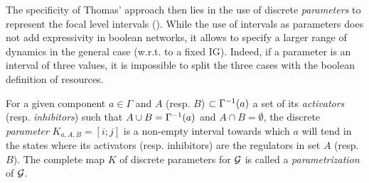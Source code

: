 The specificity of Thomas' approach then lies in the use of discrete \emph{parameters} to represent the focal level intervals ().
While the use of intervals as parameters does not add expressivity in boolean networks, it allows to specify a larger range of dynamics in the general case (w.r.t. to a fixed IG).
Indeed, if a parameter is an interval of three values, it is impossible to split the three cases with the boolean definition of resources.

\begin{definition}\label{def:param}
For a given component $a \in \Gamma$ and $A$ (resp. $B$) $\subset \Gamma^{-1}(a)$ a set of its \emph{activators} (resp. \emph{inhibitors}) such that $A \cup B = \Gamma^{-1}(a)$ and $A \cap B = \emptyset$,
the discrete \emph{parameter} $K_{a,A,B} = [i; j]$ is a non-empty interval towards which $a$ will tend
in the states where its activators (resp. inhibitors) are the regulators in set $A$ (resp. $B$).
The complete map $K$ of discrete parameters for $\mathcal{G}$ is called a \emph{parametrization} of $\mathcal{G}$.
\end{definition}

\begin{comment}
\begin{definition}[Resources $\GRNres{a}{s}$]\label{def:resources}
For a given state $s$ of a BRN, we define the \emph{activators} $A$ and \emph{inhibitors} $B$ of $a$ in $s$ as $\GRNres{a}{s} = A,B$, where:
\begin{align*}
  A &= \{b \in \Gamma \mid \GRNget{s}{b} \in \levelsA{b}{a}\} \\
  B &= \{b \in \Gamma \mid \GRNget{s}{b} \in \levelsI{b}{a}\}
\end{align*}
We also denote: $\GRNallres{a} = \{(A;B) \mid \exists s \in \textstyle\prod_{a \in \Gamma} [0;l_a], \GRNres{a}{s} = A,B\}$
\end{definition}

\end{comment}

